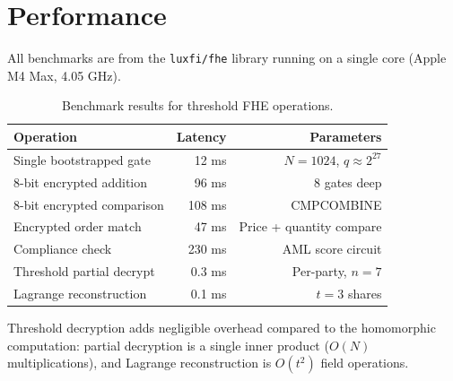 \section{Performance}

\label{sec:perf}

All benchmarks are from the \texttt{luxfi/fhe} library running on a
single core (Apple M4 Max, 4.05 GHz).

\begin{table}[h]
\centering
\begin{tabular}{lrr}
\toprule
\textbf{Operation} & \textbf{Latency} & \textbf{Parameters} \\
\midrule
Single bootstrapped gate & 12 ms & $N{=}1024$, $q{\approx}2^{27}$ \\
8-bit encrypted addition & 96 ms & 8 gates deep \\
8-bit encrypted comparison & 108 ms & CMPCOMBINE \\
Encrypted order match & 47 ms & Price + quantity compare \\
Compliance check & 230 ms & AML score circuit \\
Threshold partial decrypt & 0.3 ms & Per-party, $n{=}7$ \\
Lagrange reconstruction & 0.1 ms & $t{=}3$ shares \\
\bottomrule
\end{tabular}
\caption{Benchmark results for threshold FHE operations.}
\label{tab:benchmarks}
\end{table}

Threshold decryption adds negligible overhead compared to the
homomorphic computation: partial decryption is a single inner product
($O(N)$ multiplications), and Lagrange reconstruction is $O(t^2)$
field operations.

